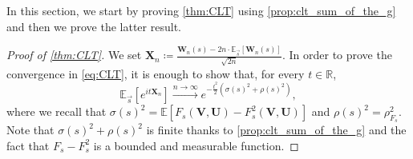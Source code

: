 \documentclass[11pt,a4paper,oneside]{article}
\theoremstyle{definition}
\theoremstyle{remark}
\def\E{\mathbb{E}}
\begin{document}
In this section, we start by proving \cref{thm:CLT} using \cref{prop:clt_sum_of_the_g} and then we prove the latter result.
\begin{proof}[Proof of \cref{thm:CLT}]
	We set $\bm X_n\coloneqq\frac{\bm W_n(s)- 2n \cdot \E_{\vec{s}}[\bm W_n(s)]}{\sqrt{2n}}$. In order to prove the convergence in \cref{eq:CLT}, it is enough to show that, for every $t \in \mathbb{R}$,
	\begin{equation}\label{eq:goal_proof_MGF}
	\E_{\vec{s}} \left[e^{it\bm X_n}\right]\xrightarrow{n\to \infty}e^{-\frac{t^2}{2} \left(\sigma(s)^2+\rho(s)^2 \right)},
	\end{equation}
	where we recall that $\sigma(s)^2=\E\left[F_s(\bm V,\bm U)-F^2_s(\bm V,\bm U)\right]$ and $\rho(s)^2 = \rho_{F_s}^2$. Note that $\sigma(s)^2+\rho(s)^2$ is finite thanks to \cref{prop:clt_sum_of_the_g} and the fact that $F_s-F_s^2$ is a bounded and measurable function.


\end{proof}
\end{document}
